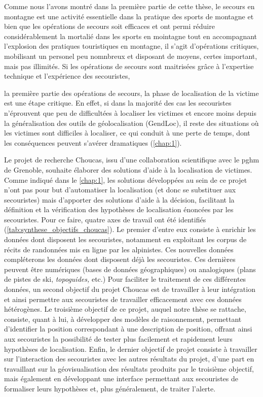 Comme nous l'avons montré dans la première partie de cette thèse, le
secours en montagne est une activité essentielle dans la pratique des
sports de montagne et bien que les opérations de secours soit
efficaces et ont permi réduire considérablement la mortalié dans les
sports en mointagne tout en accompagnant l'explosion des pratiques
touristiques en montagne, il s'agit d'opérations critiques, mobilisant
un personel peu nomnbreux et disposant de moyens, certes important,
mais pas illimités. Si les opérations de secours sont maitrisées grâce
à l'expertise technique et l'expérience des secouristes,

la première partie des opérations de secours, \ie la phase de
localisation de la victime est une étape critique. En effet, si dans
la majorité des cas les secouristes n'éprouvent que peu de
difficultées à localiser les victimes et encore moins depuis la
généralisation des outils de géolocalisation (\eg GendLoc), il reste
des situations où les victimes sont difficiles à localiser, ce qui
conduit à une perte de temps, dont les conséquences peuvent s'avérer
dramatiques (\autoref{chap:1}).

Le projet de recherche Choucas, issu d'une collaboration scientifique
avec le \ac{pghm} de Grenoble, souhaite élaborer des solutions d'aide
à la localisation de victimes. Comme indiqué dans le \autoref{chap:1},
les solutions développées au sein de ce projet n'ont pas pour but
d'automatiser la localisation (et donc se substituer aux secouristes)
mais d'apporter des solutions d'aide à la décision, facilitant la
définition et la vérification des hypothèses de localisation énoncées
par les secouristes. Pour ce faire, quatre axes de travail ont été
identifiés (\autoref{tab:synthese_objectifs_choucas}). Le premier
d'entre eux consiste à enrichir les données dont disposent les
secouristes, notamment en exploitant les corpus de récits de
randonnées mis en ligne par les alpinistes. Ces nouvelles données
compléterons les données dont disposent déjà les secouristes. Ces
dernières peuvent être numériques (\eg bases de données géographiques)
ou analogiques (\eg plans de pistes de ski, \emph{topoguides,} etc.)
%
Pour faciliter le traitement de ces différentes données, un second
objectif du projet Choucas est de travailler à leur intégration et
ainsi permettre aux secouristes de travailler efficacement avec ces
données hétérogènes.
%
Le troisième objectif de ce projet, auquel notre thèse se rattache,
consiste, quant à lui, à développer des modèles de raisonnement,
permettant d'identifier la position correspondant à une description de
position, offrant ainsi aux secouristes la possibilité de tester plus
facilement et rapidement leurs hypothèses de localisation.
%
Enfin, le dernier objectif de projet consiste à travailler sur
l'interaction des secouristes avec les autres résultats du projet,
d'une part en travaillant sur la géovisualisation des résultats
produits par le troisième objectif, mais également en développant une
interface permettant aux secouristes de formaliser leurs hypothèses
et, plus généralement, de traiter l'alerte.

